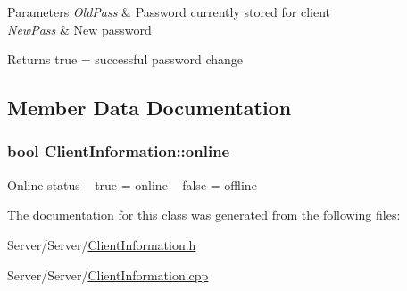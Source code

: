 \begin{DoxyParams}{Parameters}
{\em Old\+Pass} & Password currently stored for client \\
\hline
{\em New\+Pass} & New password\\
\hline
\end{DoxyParams}
\begin{DoxyReturn}{Returns}
true = successful password change 
\end{DoxyReturn}


\subsection{Member Data Documentation}
\hypertarget{class_client_information_a86bb07c3a9a52fb4a1ba944dabcbe537}{}
\subsubsection[{online}]{\setlength{\rightskip}{0pt plus 5cm}bool Client\+Information\+::online}\label{class_client_information_a86bb07c3a9a52fb4a1ba944dabcbe537}
Online status ~\newline
true = online ~\newline
false = offline 

The documentation for this class was generated from the following files\+:\begin{DoxyCompactItemize}
\item 
Server/\+Server/\hyperlink{_client_information_8h}{Client\+Information.\+h}\item 
Server/\+Server/\hyperlink{_client_information_8cpp}{Client\+Information.\+cpp}\end{DoxyCompactItemize}
